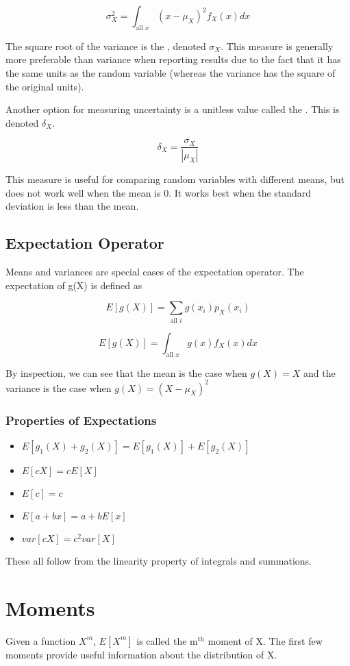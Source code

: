 \[ 
    \sigma_X^2 = \int_{\text{all } x}(x - \mu_X)^2f_X(x)dx
\]

The square root of the variance is the , denoted $\sigma_X$. This measure is generally more preferable than variance when reporting results due to the fact that it has the same units as the random variable (whereas the variance has the square of the original units).

Another option for measuring uncertainty is a unitless value called the . This is denoted $\delta_X$.

\[
    \delta_X = \frac{\sigma_X}{|\mu_X|}
\]

This measure is useful for comparing random variables with different means, but does not work well when the mean is 0. It works best when the standard deviation is less than the mean.

\subsection*{Expectation Operator}
Means and variances are special cases of the expectation operator. The expectation of g(X) is defined as 

\[
    E[g(X)] = \sum_{\text{all } i}g(x_i)p_X(x_i)
\]

\[
    E[g(X)] = \int_{\text{all } x}g(x)f_X(x)dx
\]

By inspection, we can see that the mean is the case when $g(X) = X$ and the variance is the case when $g(X) = (X - \mu_X)^2$

\subsubsection*{Properties of Expectations}
\begin{itemize}
    \item $E[g_1(X) + g_2(X)] = E[g_1(X)] + E[g_2(X)]$
    \item $E[cX] = cE[X]$
    \item $E[c] = c$
    \item $E[a + bx] = a + bE[x]$
    \item $var[cX] = c^2var[X]$
\end{itemize}

These all follow from the linearity property of integrals and summations.

\section{Moments}
Given a function $X^m$, $E[X^m]$ is called the m$^\text{th}$ moment of X. The first few moments provide useful information about the distribution of X.

